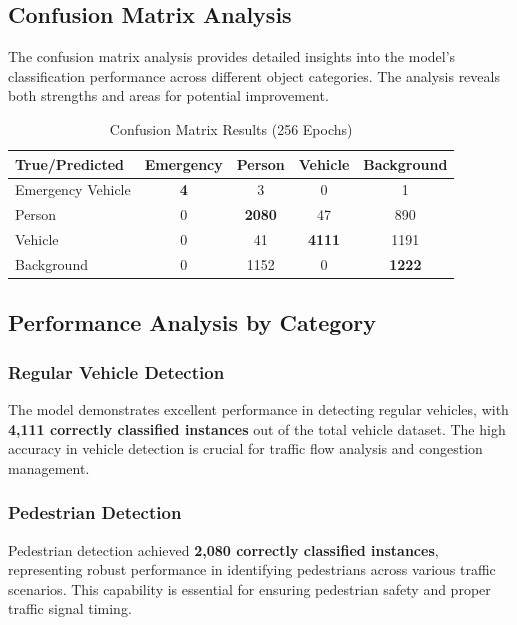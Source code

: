 \subsection{Confusion Matrix Analysis}
The confusion matrix analysis provides detailed insights into the model's classification performance across different object categories. The analysis reveals both strengths and areas for potential improvement.

\begin{table}[h]
\centering
\caption{Confusion Matrix Results (256 Epochs)}
\label{tab:confusion_matrix}
\begin{tabular}{|l|c|c|c|c|}
\hline
\textbf{True/Predicted} & \textbf{Emergency} & \textbf{Person} & \textbf{Vehicle} & \textbf{Background} \\
\hline
Emergency Vehicle & \textbf{4} & 3 & 0 & 1 \\
Person & 0 & \textbf{2080} & 47 & 890 \\
Vehicle & 0 & 41 & \textbf{4111} & 1191 \\
Background & 0 & 1152 & 0 & \textbf{1222} \\
\hline
\end{tabular}
\end{table}

\subsection{Performance Analysis by Category}

\subsubsection{Regular Vehicle Detection}
The model demonstrates excellent performance in detecting regular vehicles, with \textbf{4,111 correctly classified instances} out of the total vehicle dataset. The high accuracy in vehicle detection is crucial for traffic flow analysis and congestion management.

\subsubsection{Pedestrian Detection}
Pedestrian detection achieved \textbf{2,080 correctly classified instances}, representing robust performance in identifying pedestrians across various traffic scenarios. This capability is essential for ensuring pedestrian safety and proper traffic signal timing.

